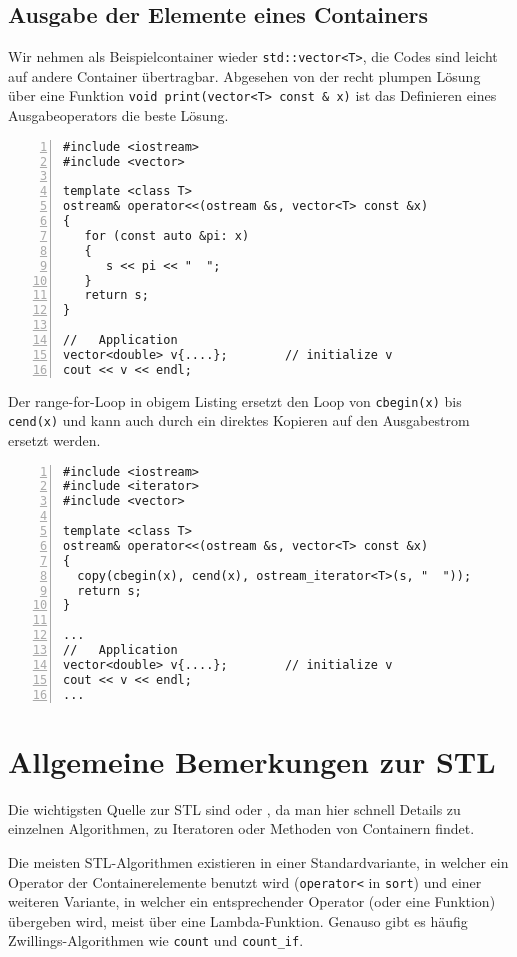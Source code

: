 %
\subsection{Ausgabe der Elemente eines Containers}
\label{p:11.3.8}
% 
Wir nehmen als Beispielcontainer wieder \texttt{std::vector<T>}, die Codes sind leicht auf 
andere Container übertragbar. 
Abgesehen von der recht plumpen Lösung über eine Funktion \verb|void print(vector<T> const & x)| 
ist das Definieren eines Ausgabeoperators die beste Lösung.
%
\begin{lstlisting}[caption={Vektorausgabe: Version 1},label=lst:cout_vector1,
basicstyle=\scriptsize,numbers=left, numberstyle=\tiny, stepnumber=2, numbersep=5pt]
#include <iostream>
#include <vector>

template <class T>
ostream& operator<<(ostream &s, vector<T> const &x)
{
   for (const auto &pi: x)
   {
      s << pi << "  ";
   }
   return s;
}

//   Application
vector<double> v{....};        // initialize v
cout << v << endl;
\end{lstlisting}  
%
Der range-for-Loop in obigem Listing ersetzt den Loop von \verb|cbegin(x)| bis \verb|cend(x)| 
und kann auch durch ein direktes Kopieren auf den Ausgabestrom ersetzt werden.
%
\begin{lstlisting}[caption={Vektorausgabe: Version 2},label=lst:cout_vector1,
basicstyle=\scriptsize,numbers=left, numberstyle=\tiny, stepnumber=2, numbersep=5pt]
#include <iostream>
#include <iterator>
#include <vector>

template <class T>
ostream& operator<<(ostream &s, vector<T> const &x)
{
  copy(cbegin(x), cend(x), ostream_iterator<T>(s, "  "));
  return s;
}

...
//   Application
vector<double> v{....};        // initialize v
cout << v << endl;
...
\end{lstlisting}  
%
%
%
\section{Allgemeine Bemerkungen zur STL}
\label{p:11.4}
%
Die wichtigsten Quelle zur STL sind   oder  , 
da man hier schnell Details zu einzelnen Algorithmen, zu Iteratoren oder Methoden von Containern findet. 

Die meisten STL-Algorithmen existieren in einer Standardvariante, in welcher ein Operator 
der Containerelemente benutzt wird (\verb|operator<| in \verb|sort|) und einer weiteren Variante, in welcher 
ein entsprechender Operator (oder eine Funktion) übergeben wird, meist über eine Lambda-Funktion. 
Genauso gibt es häufig Zwillings-Algorithmen wie \verb|count| und \verb|count_if|. 
%
%
%
